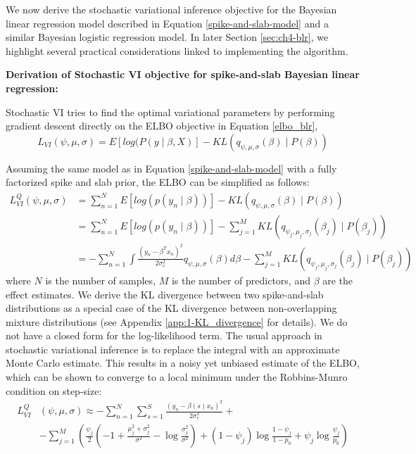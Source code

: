 %
We now derive the stochastic variational inference objective for the Bayesian linear regression model described in Equation \ref{spike-and-slab-model} and a similar Bayesian logistic regression model.
%
In later Section \ref{sec:ch4-blr}, we highlight several practical considerations linked to implementing the algorithm.
%

\noindent \textbf{Derivation of Stochastic VI objective for spike-and-slab Bayesian linear regression:}
%

%
Stochastic VI tries to find the optimal variational parameters by performing gradient descent directly on the ELBO objective in Equation \ref{elbo_blr},
\begin{equation}
    L_{VI}(\psi, \mu, \sigma) = E[log(P( y \mid \beta,X)] - KL(q_{\psi, \mu, \sigma}(\beta) \mid P(\beta))
\end{equation}

%
Assuming the same model as in Equation \ref{spike-and-slab-model} with a fully factorized spike and slab prior, the ELBO can be simplified as follows:
\begin{align}
 L^{Q}_{VI}(\psi, \mu, \sigma) &= \sum\limits^{N}_{n=1} E[log(p(y_{n} \mid \beta))] - KL(q_{\psi, \mu, \sigma}(\beta) \mid P(\beta)) \nonumber \\
 &= \sum\limits^{N}_{n=1} E[log(p(y_{n} \mid \beta))] - \sum\limits^{M}_{j=1} KL(q_{\psi_j, \mu_j, \sigma_j}(\beta_j) \mid P(\beta_j)) \nonumber \\
 &= - \sum\limits^{N}_{n=1} \int \frac{(y_n - \beta^T x_n)^2}{2 \sigma_e^2} q_{\psi, \mu, \sigma}(\beta) d\beta - \sum\limits^{M}_{j=1} KL(q_{\psi_j, \mu_j, \sigma_j}(\beta_j) \mid P(\beta_j)) \label{spike-and-slab-1}
\end{align}
where $N$ is the number of samples, $M$ is the number of predictors, and $\beta$ are the effect estimates.
%
We derive the KL divergence between two spike-and-slab distributions as a special case of the KL divergence between non-overlapping mixture distributions (see Appendix \ref{app:1-KL_divergence} for details).
%
We do not have a closed form for the log-likelihood term.
%
The usual approach in stochastic variational inference is to replace the integral with an approximate Monte Carlo estimate.
%
This results in a noisy yet unbiased estimate of the ELBO, which can be shown to converge to a local minimum under the Robbins-Munro condition \cite{robbins1951stochastic} on step-size:
\begin{align}
    L^{Q}_{VI}&(\psi, \mu, \sigma) \approx - \sum\limits^{N}_{n=1} \sum\limits^{S}_{s=1} \frac{(y_n - \beta(s) x_n)^2}{2 \sigma_e^2} + \nonumber \\
    &- \sum\limits^{M}_{j=1} \left(  \frac{\psi_j}{2}\left(-1 + \frac{\mu_j^2 + \sigma_j^2}{\sigma^2} - \log \frac{\sigma_j^2}{\sigma^2} \right) + (1-\psi_j)\log\frac{1 - \psi_j}{1 - p_0} + \psi_j\log\frac{\psi_j}{p_0} \right )
\end{align}

